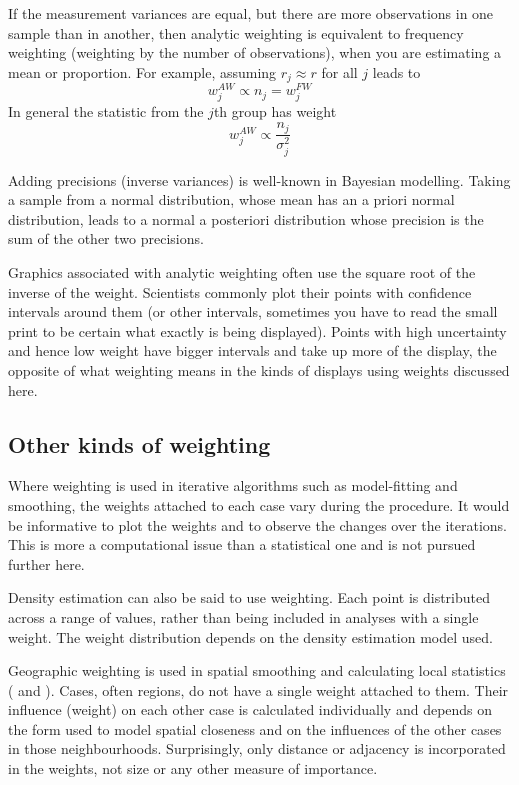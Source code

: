 \documentclass{svmult}
\begin{document}
If the measurement variances are equal, but there are more observations in one sample than in another, then analytic weighting is equivalent to frequency weighting (weighting by the number of observations), when you are estimating a mean or proportion.  For example, assuming $r_j\approx r$ for all $j$ leads to
$$w_j^{AW} \propto n_j=w_j^{FW}$$
In general the statistic from the $j$th group has weight
$$w_j^{AW} \propto \frac{n_j}{\sigma^2_j}$$

Adding precisions (inverse variances) is well-known in Bayesian modelling.  Taking a sample from a normal distribution, whose mean has an a priori normal distribution, leads to a normal a posteriori distribution whose precision is the sum of the other two precisions.

Graphics associated with analytic weighting often use the square root of the inverse of the weight.  Scientists commonly plot their points with confidence intervals around them (or other intervals, sometimes you have to read the small print to be certain what exactly is being displayed).  Points with high uncertainty and hence low weight have bigger intervals and take up more of the display, the opposite of what weighting means in the kinds of displays using weights discussed here.

\subsection{Other kinds of weighting}
\label{otherw}
Where weighting is used in iterative algorithms such as model-fitting and smoothing, the weights attached to each case vary during the procedure.  It would be informative to plot the weights and to observe the changes over the iterations.  This is more a computational issue than a statistical one and is not pursued further here.

Density estimation can also be said to use weighting.  Each point is distributed across a range of values, rather than being included in analyses with a single weight.  The weight distribution depends on the density estimation model used.

Geographic weighting is used in spatial smoothing and calculating local statistics (\cite{unwin:1998b} and \cite{brunsdon:2007}).  Cases, often regions, do not have a single weight attached to them.  Their influence (weight) on each other case is calculated individually and depends on the form used to model spatial closeness and on the influences of the other cases in those neighbourhoods.  Surprisingly, only distance or adjacency is incorporated in the weights, not size or any other measure of importance.
\end{document}
